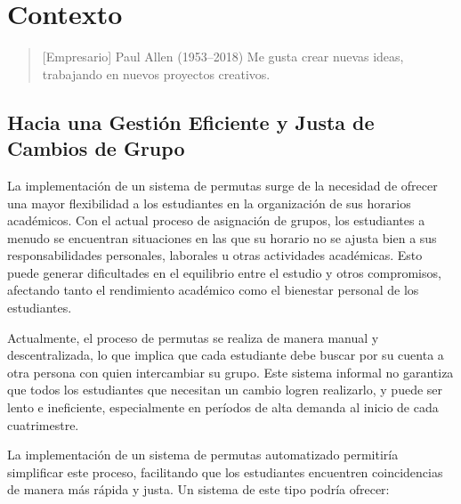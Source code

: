 \chapter{Contexto}

\begin{quotation} [Empresario] {Paul Allen (1953--2018)}
Me gusta crear nuevas ideas, trabajando en nuevos proyectos creativos.
\end{quotation}

\begin{abstract}
Comenzar un proyecto no es sencillo, lo primero que hemos de hacer es proveer de contexto para evaluar dónde nos encontramos.
\end{abstract}

\section{Hacia una Gestión Eficiente y Justa de Cambios de Grupo}

La implementación de un sistema de permutas surge de la necesidad de ofrecer una mayor flexibilidad a los estudiantes en la organización de sus horarios académicos. Con el actual proceso de asignación de grupos, los estudiantes a menudo se encuentran situaciones en las que su horario no se ajusta bien a sus responsabilidades personales, laborales u otras actividades académicas. Esto puede generar dificultades en el equilibrio entre el estudio y otros compromisos, afectando tanto el rendimiento académico como el bienestar personal de los estudiantes.

Actualmente, el proceso de permutas se realiza de manera manual y descentralizada, lo que implica que cada estudiante debe buscar por su cuenta a otra persona con quien intercambiar su grupo. Este sistema informal no garantiza que todos los estudiantes que necesitan un cambio logren realizarlo, y puede ser lento e ineficiente, especialmente en períodos de alta demanda al inicio de cada cuatrimestre.

La implementación de un sistema de permutas automatizado permitiría simplificar este proceso, facilitando que los estudiantes encuentren coincidencias de manera más rápida y justa. Un sistema de este tipo podría ofrecer:

